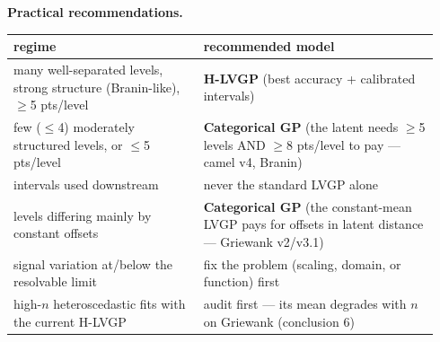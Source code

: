 \noindent\textbf{Practical recommendations.}\\[2pt]
\begin{tabular}{p{0.42\linewidth}p{0.52\linewidth}}
\toprule
regime & recommended model \\
\midrule
many well-separated levels, strong structure (Branin-like), $\geq$5 pts/level & \textbf{H-LVGP} (best accuracy + calibrated intervals) \\
few ($\leq$4) moderately structured levels, or $\leq$5 pts/level & \textbf{Categorical GP} (the latent needs $\geq$5 levels AND $\geq$8 pts/level to pay --- camel v4, Branin) \\
intervals used downstream & never the standard LVGP alone \\
levels differing mainly by constant offsets & \textbf{Categorical GP} (the constant-mean LVGP pays for offsets in latent distance --- Griewank v2/v3.1) \\
signal variation at/below the resolvable limit & fix the problem (scaling, domain, or function) first \\
high-$n$ heteroscedastic fits with the current H-LVGP & audit first --- its mean degrades with $n$ on Griewank (conclusion 6) \\
\bottomrule
\end{tabular}
